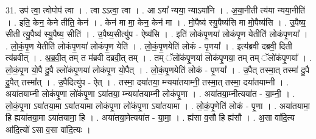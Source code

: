 \documentclass[17pt]{extarticle}
\begin{document}
31. उप॑ त्वा॒ त्वोपोप॑ त्वा । . त्वा ऽऽत्वा॒ त्वा । . आ ऽया᳚ न्यया॒ न्याऽया॑नि । . अ॒या॒नीती त्य॑या न्यया॒नीति॑ । . इति॒ केन॒ केने तीति॒ केन॑ । . केन॑ मा मा॒ केन॒ केन॑ मा । . मो॒पैष्य॑ स्यु॒पैष्य॑सि मा मो॒पैष्य॑सि । . उ॒पैष्य॒ सीती त्यु॒पैष्य॑ स्यु॒पैष्य॒ सीति॑ । . उ॒पैष्य॒सीत्यु॑प - ऐष्य॑सि । . इति॑ लोकंपृ॒णया॑ लोकंपृ॒ण येतीति॑ लोकंपृ॒णया᳚ । . लो॒कं॒पृ॒ण येतीति॑ लोकंपृ॒णया॑ लोकंपृ॒ण येति॑ । . लो॒कं॒पृ॒णयेति॑ लोकं - पृ॒णया᳚ । . इत्य॑ब्रवी दब्रवी॒ दिती त्य॑ब्रवीत् । . अ॒ब्र॒वी॒त् तम् त म॑ब्रवी दब्रवी॒त् तम् । . तम् ॅलो॑कंपृ॒णया॑ लोकंपृ॒णया॒ तम् तम् ॅलो॑कंपृ॒णया᳚ । . लो॒कं॒पृ॒ण यो॒पै दु॒पै ल्लो॑कंपृ॒णया॑ लोकंपृ॒ण यो॒पैत् । . लो॒कं॒पृ॒णयेति॑ लोकं - पृ॒णया᳚ । . उ॒पैत् तस्मा॒त् तस्मा॑ दु॒पै दु॒पैत् तस्मा᳚त् । . उ॒पैदित्यु॑प - ऐत् । . तस्मा॒ दया॑तया॒ म्न्यया॑तयाम्नी॒ तस्मा॒त् तस्मा॒ दया॑तयाम्नी । . अया॑तयाम्नी लोकंपृ॒णा लो॑कंपृ॒णा ऽया॑तया॒ म्न्यया॑तयाम्नी लोकंपृ॒णा । . अया॑तया॒म्नीत्यया॑त - या॒म्नी॒ । . लो॒कं॒पृ॒णा ऽया॑तया॒मा ऽया॑तयामा लोकंपृ॒णा लो॑कंपृ॒णा ऽया॑तयामा । . लो॒कं॒पृ॒णेति॑ लोकं - पृ॒णा । . अया॑तयामा॒ हि ह्यया॑तया॒मा ऽया॑तयामा॒ हि । . अया॑तया॒मेत्यया॑त - या॒मा॒ । . ह्य॑सा व॒सौ हि ह्य॑सौ । . अ॒सा वा॑दि॒त्य आ॑दि॒त्यो॑ ऽसा व॒सा वा॑दि॒त्यः । \newline
\end{document}
